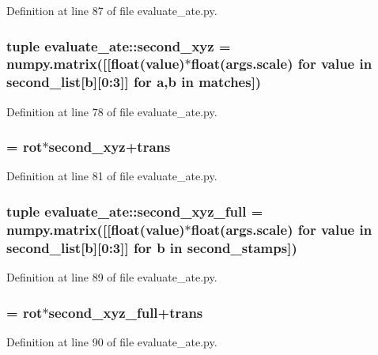 \-Definition at line 87 of file evaluate\-\_\-ate.\-py.

\subsubsection[{second\-\_\-xyz}]{\setlength{\rightskip}{0pt plus 5cm}tuple {\bf evaluate\-\_\-ate\-::second\-\_\-xyz} = numpy.\-matrix([[float(value)$\ast$float(args.\-scale) for value in {\bf second\-\_\-list}[b][0\-:3]] for a,b in {\bf matches}])}\label{namespaceevaluate__ate_a037306d05b990450a719aba591c16776}


\-Definition at line 78 of file evaluate\-\_\-ate.\-py.

\subsubsection[{second\-\_\-xyz\-\_\-aligned}]{ = rot$\ast${\bf second\-\_\-xyz}+trans}\label{namespaceevaluate__ate_a6b2972db49ee6dcacf0fcebd3d967155}


\-Definition at line 81 of file evaluate\-\_\-ate.\-py.

\subsubsection[{second\-\_\-xyz\-\_\-full}]{\setlength{\rightskip}{0pt plus 5cm}tuple {\bf evaluate\-\_\-ate\-::second\-\_\-xyz\-\_\-full} = numpy.\-matrix([[float(value)$\ast$float(args.\-scale) for value in {\bf second\-\_\-list}[b][0\-:3]] for b in {\bf second\-\_\-stamps}])}\label{namespaceevaluate__ate_aed5ec8dd2d4f77467d10c74b6e2c9112}


\-Definition at line 89 of file evaluate\-\_\-ate.\-py.

\subsubsection[{second\-\_\-xyz\-\_\-full\-\_\-aligned}]{ = rot$\ast${\bf second\-\_\-xyz\-\_\-full}+trans}\label{namespaceevaluate__ate_ac263578681ea7489e16b1e4810b22428}


\-Definition at line 90 of file evaluate\-\_\-ate.\-py.

